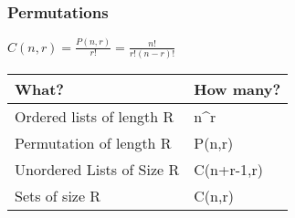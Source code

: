 \documentclass[8pt]{article}
\begin{document}
\begin{paracol}{3}
        \subsubsection*{Permutations}
        $C(n,r) = \frac{P(n,r)}{r!} = \frac{n!}{r!(n-r)!}$ \\
        \begin{tabular}{|l|l|}
            \hline
            What?                     & How many?            \\ \hline
            Ordered lists of length R & n\textasciicircum{}r \\ \hline
            Permutation of length R   & P(n,r)               \\ \hline
            Unordered Lists of Size R & C(n+r-1,r)           \\ \hline
            Sets of size R            & C(n,r)               \\ \hline
        \end{tabular}

\end{paracol}
\end{document}
